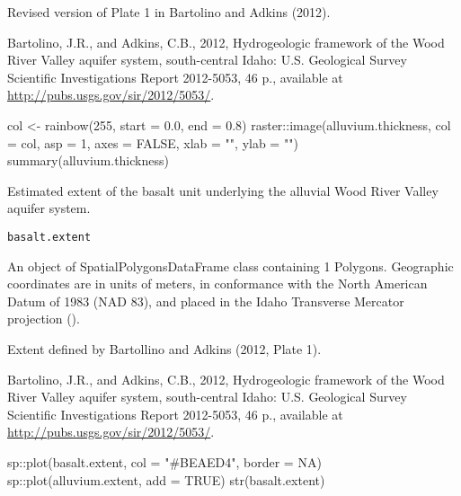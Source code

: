 \documentclass[a4paper]{book}
\begin{document}
%
\begin{Source}\relax
Revised version of Plate 1 in Bartolino and Adkins (2012).
\end{Source}
%
\begin{References}\relax
Bartolino, J.R., and Adkins, C.B., 2012,
Hydrogeologic framework of the Wood River Valley aquifer system, south-central Idaho:
U.S. Geological Survey Scientific Investigations Report 2012-5053, 46 p.,
available at \url{http://pubs.usgs.gov/sir/2012/5053/}.
\end{References}
%
\begin{Examples}
\begin{ExampleCode}
col <- rainbow(255, start = 0.0, end = 0.8)
raster::image(alluvium.thickness, col = col, asp = 1, axes = FALSE,
              xlab = "", ylab = "")
summary(alluvium.thickness)

\end{ExampleCode}
\end{Examples}
%
\begin{Description}\relax
Estimated extent of the basalt unit underlying the alluvial Wood River Valley aquifer system.
\end{Description}
%
\begin{Usage}
\begin{verbatim}
basalt.extent
\end{verbatim}
\end{Usage}
%
\begin{Format}
An object of SpatialPolygonsDataFrame class containing 1 Polygons.
Geographic coordinates are in units of meters, in conformance with the
North American Datum of 1983 (NAD 83), and placed in the
Idaho Transverse Mercator projection ().
\end{Format}
%
\begin{Source}\relax
Extent defined by Bartollino and Adkins (2012, Plate 1).
\end{Source}
%
\begin{References}\relax
Bartolino, J.R., and Adkins, C.B., 2012,
Hydrogeologic framework of the Wood River Valley aquifer system, south-central Idaho:
U.S. Geological Survey Scientific Investigations Report 2012-5053, 46 p.,
available at \url{http://pubs.usgs.gov/sir/2012/5053/}.
\end{References}
%
\begin{Examples}
\begin{ExampleCode}
sp::plot(basalt.extent, col = "#BEAED4", border = NA)
sp::plot(alluvium.extent, add = TRUE)
str(basalt.extent)

\end{ExampleCode}
\end{Examples}
\end{document}
